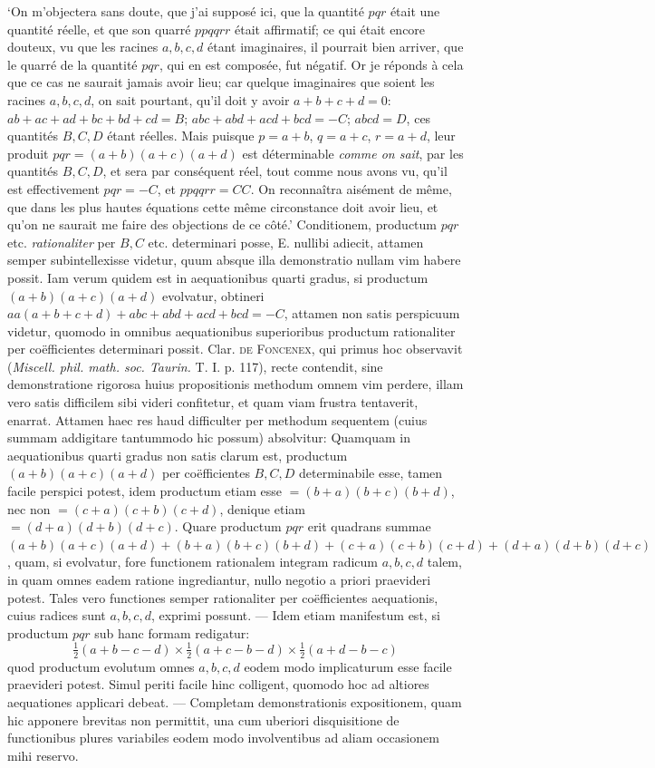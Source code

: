 \lq On m'objectera sans doute, que j'ai supposé ici, que la quantité $pqr$ était
une quantité réelle, et que son quarré $ppqqrr$ était affirmatif; ce qui était encore
douteux, vu que les racines $a,b,c,d$ étant imaginaires, il pourrait bien arriver,
que le quarré de la quantité $pqr$, qui en est composée, fut négatif. Or je réponds
à cela que ce cas ne saurait jamais avoir lieu; car quelque imaginaires que
soient les racines $a,b,c,d$, on sait pourtant, qu'il doit y avoir $a+b+c+d=0$:
$ab+ac+ad+bc+bd+cd=B$; $abc+abd+acd+bcd=-C$; $abcd=D$,
ces quantités $B,C,D$ étant réelles. Mais puisque $p=a+b$, $q=a+c$,
$r=a+d$, leur produit $pqr=(a+b)(a+c)(a+d)$ est déterminable \textit{comme on
sait}, par les quantités $B,C,D$, et sera par conséquent réel, tout comme nous
avons vu, qu'il est effectivement $pqr=-C$, et $ppqqrr=CC$. On reconnaîtra
aisément de même, que dans les plus hautes équations cette même circonstance
doit avoir lieu, et qu'on ne saurait me faire des objections de ce
côté.\rq
Conditionem, productum $pqr$ etc. \textit{rationaliter} per $B,C$ etc. determinari
posse, E. nullibi adiecit, attamen semper subintellexisse videtur, quum absque
illa demonstratio nullam vim habere possit. Iam verum quidem est in aequationibus
quarti gradus, si productum $(a+b)(a+c)(a+d)$ evolvatur, obtineri
$aa(a+b+c+d)+abc+abd+acd+bcd=-C$, attamen non satis perspicuum
videtur, quomodo in omnibus aequationibus superioribus productum rationaliter
per coëfficientes determinari possit. Clar. \textsc{de Foncenex}, qui primus hoc observavit
(\textit{Miscell. phil. math. soc. Taurin.} T. I. p. 117), recte contendit, sine demonstratione
rigorosa huius propositionis methodum omnem vim perdere, illam vero
satis difficilem sibi videri confitetur, et quam viam frustra tentaverit, enarrat.
Attamen haec res haud difficulter per methodum sequentem (cuius summam
addigitare tantummodo hic possum) absolvitur: Quamquam in aequationibus quarti
gradus non satis clarum est, productum $(a+b)(a+c)(a+d)$ per coëfficientes
$B,C,D$ determinabile esse, tamen facile perspici potest, idem productum
etiam esse $=(b+a)(b+c)(b+d)$, nec non $=(c+a)(c+b)(c+d)$,
denique etiam $=(d+a)(d+b)(d+c)$. Quare productum $pqr$ erit quadrans summae
$(a+b)(a+c)(a+d)+(b+a)(b+c)(b+d)+(c+a)(c+b)(c+d)+(d+a)(d+b)(d+c)$,
quam, si evolvatur, fore functionem rationalem integram radicum $a,b,c,d$ talem,
in quam omnes eadem ratione ingrediantur, nullo negotio a priori praevideri
potest. Tales vero functiones semper rationaliter per coëfficientes aequationis,
cuius radices sunt $a,b,c,d$, exprimi possunt. --- Idem etiam manifestum est,
si productum $pqr$ sub hanc formam redigatur:
\[
\tfrac12(a+b-c-d)\times\tfrac12(a+c-b-d)\times\tfrac12(a+d-b-c)
\]
quod productum evolutum omnes $a,b,c,d$ eodem modo implicaturum esse facile
praevideri potest. Simul periti facile hinc colligent, quomodo hoc ad altiores
aequationes applicari debeat. --- Completam demonstrationis expositionem, quam
hic apponere brevitas non permittit, una cum uberiori disquisitione de functionibus
plures variabiles eodem modo involventibus ad aliam occasionem mihi reservo.


